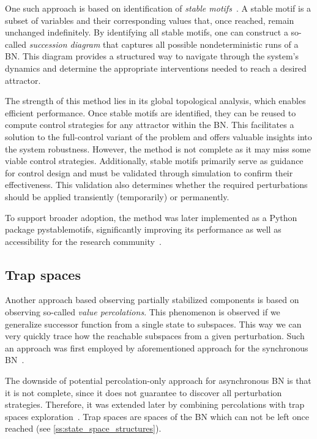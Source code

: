 One such approach is based on identification of \emph{stable motifs}~\cite{Zanudo2013,Zanudo2015}. A stable motif is a subset of variables and their corresponding values that, once reached, remain unchanged indefinitely. By identifying all stable motifs, one can construct a so-called \emph{succession diagram} that captures all possible nondeterministic runs of a BN. This diagram provides a structured way to navigate through the system's dynamics and determine the appropriate interventions needed to reach a desired attractor.

The strength of this method lies in its global topological analysis, which enables efficient performance. Once stable motifs are identified, they can be reused to compute control strategies for any attractor within the BN. This facilitates a solution to the full-control variant of the problem and offers valuable insights into the system robustness. However, the method is not complete as it may miss some viable control strategies. Additionally, stable motifs primarily serve as guidance for control design and must be validated through simulation to confirm their effectiveness. This validation also determines whether the required perturbations should be applied transiently (temporarily) or permanently.

To support broader adoption, the method was later implemented as a Python package pystablemotifs, significantly improving its performance as well as accessibility for the research community~\cite{Rozum2022}.

\subsection{Trap spaces} 
\label{ss:asp}

Another approach based observing partially stabilized components is based on observing so-called \emph{value percolations}. This phenomenon is observed if we generalize successor function from a single state to subspaces. This way we can very quickly trace how the reachable subspaces from a given perturbation. Such an approach was first employed by aforementioned approach for the synchronous BN~\cite{Krumsiek2011,Videla2017}.

The downside of potential percolation-only approach for asyn\-chro\-nous BN is that it is not complete, since it does not guarantee to discover all perturbation strategies. Therefore, it was extended later by combining percolations with trap spaces exploration~\cite{Fontanals2020}. Trap spaces are spaces of the BN which can not be left once reached (see \autoref{ss:state_space_structures}). 

